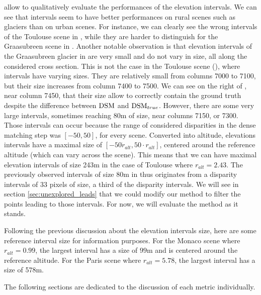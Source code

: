  allow to qualitatively evaluate the performances of the elevation intervals. We can see that intervals seem to have better performances on rural scenes such as glaciers than on urban scenes. For instance, we can clearly see the wrong intervals of the Toulouse scene in , while they are harder to distinguish for the Graasubreen scene in . Another notable observation is that elevation intervals of the Graasubreen glacier in  are very small and do not vary in size, all along the considered cross section. This is not the case in the Toulouse scene (), where intervals have varying sizes. They are relatively small from columns 7000 to 7100, but their size increases from column 7400 to 7500. We can see on the right of , near column 7450, that their size allow to correctly contain the ground truth despite the difference between $\mathrm{DSM}$ and $\mathrm{DSM}_{true}$. However, there are some very large intervals, sometimes reaching $80$m of size, near columns 7150, or 7300. Those intervals can occur because the range of considered disparities in the dense matching step was $[-50, 50]$, for every scene. Converted into altitude, elevations intervals have a maximal size of $[-50\dot r_{alt}, 50\cdot r_{alt}]$, centered around the reference altitude (which can vary across the scene). This means that we can have maximal elevation intervals of size 243m in the case of Toulouse where $r_{alt}=2.43$. The previously observed intervals of size 80m in  thus originates from a disparity intervals of 33 pixels of size, \ie a third of the disparity intervals. We will see in section \ref{sec:unexplored_leads} that we could modify our method to filter the points leading to those intervals. For now, we will evaluate the method as it stands. 

\begin{remark}
    Following the previous discussion about the elevation intervals size, here are some reference interval size for information purposes. For the Monaco scene where $r_{alt}=0.99$, the largest interval has a size of $99$m and is centered around the reference altitude. For the Paris scene where  $r_{alt}=5.78$, the largest interval has a size of 578m.
\end{remark}

The following sections are dedicated to the discussion of each metric individually.

